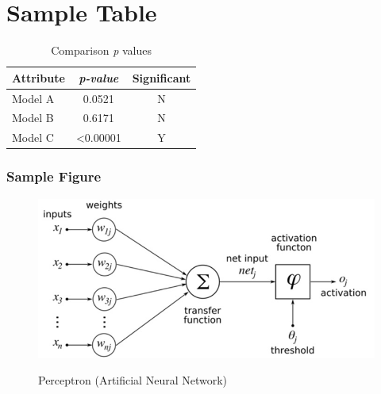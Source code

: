 \documentclass[12pt]{article}
\begin{document}
\pagebreak
\section{Sample Table}
\begin{table}[ht!]
\centering
    
	\caption{Comparison \textit{p} values}
	\begin{tabular}{ |l|c|c|}	
		\hline		
		\textbf{Attribute} & \textbf{\textit{p-value}} & \textbf{Significant} \\ \hline
		Model A	 & 0.0521 & N \\ \hline
		Model B  & 0.6171 & N \\ \hline 
		Model C  & <0.00001 & Y \\ \hline 
	\end{tabular}
	\label{tab:pvalues}
\end{table} 


\subsubsection{Sample Figure}
\begin{figure}[ht!]
 	\centering
 	\caption{Perceptron (Artificial Neural Network)}
 	\includegraphics[width=0.7\linewidth]{images/ANN.jpg}
 	\label{lab:perceptron}
 \end{figure}
\pagebreak





\renewcommand{\bibname}{References} %
\end{document}

